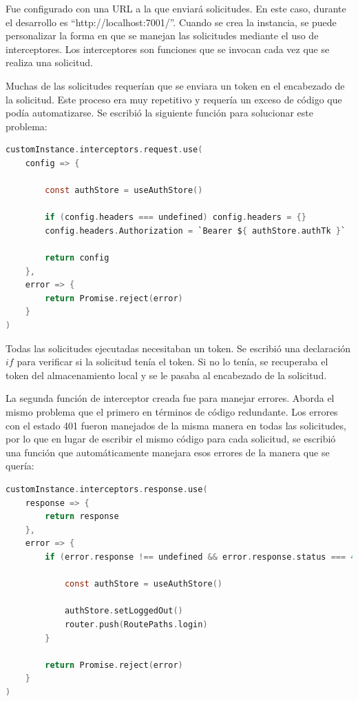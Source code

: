 Fue configurado con una URL a la que enviará solicitudes. En este caso, durante el desarrollo es ``http://localhost:7001/''. Cuando se crea la instancia, se puede personalizar la forma en que se manejan las solicitudes mediante el uso de interceptores. Los interceptores son funciones que se invocan cada vez que se realiza una solicitud.

Muchas de las solicitudes requerían que se enviara un token en el encabezado de la solicitud. Este proceso era muy repetitivo y requería un exceso de código que podía automatizarse. Se escribió la siguiente función para solucionar este problema:

\begin{lstlisting}[language=C,caption={Interceptor de solicitudes}, label={lst:axios2}]
customInstance.interceptors.request.use(
    config => {

        const authStore = useAuthStore()  

        if (config.headers === undefined) config.headers = {}                               
        config.headers.Authorization = `Bearer ${ authStore.authTk }`      // assign store token to axios configuration

        return config
    },
    error => {
        return Promise.reject(error)
    }
)
\end{lstlisting}

Todas las solicitudes ejecutadas necesitaban un token. Se escribió una declaración $if$ para verificar si la solicitud tenía el token. Si no lo tenía, se recuperaba el token del almacenamiento local y se le pasaba al encabezado de la solicitud.


La segunda función de interceptor creada fue para manejar errores. Aborda el mismo problema que el primero en términos de código redundante. Los errores con el estado 401 fueron manejados de la misma manera en todas las solicitudes, por lo que en lugar de escribir el mismo código para cada solicitud, se escribió una función que automáticamente manejara esos errores de la manera que se quería:

\begin{lstlisting}[language=C,caption={Interceptor de respuestas de Axios}, label={lst:axios2}]
customInstance.interceptors.response.use(
    response => {
        return response
    },
    error => {
        if (error.response !== undefined && error.response.status === 401) {

            const authStore = useAuthStore()

            authStore.setLoggedOut()
            router.push(RoutePaths.login)
        }

        return Promise.reject(error)
    }
)
\end{lstlisting}

